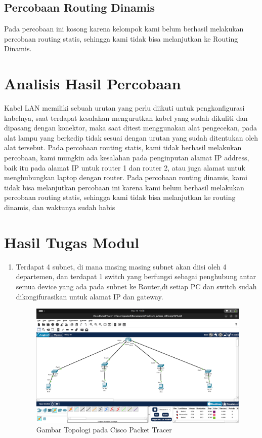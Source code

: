 \subsection{Percobaan Routing Dinamis}
Pada percobaan ini kosong karena kelompok kami belum berhasil melakukan percobaan routing statis,
sehingga kami tidak bisa melanjutkan ke Routing Dinamis.

\section{Analisis Hasil Percobaan}
Kabel LAN memiliki sebuah urutan yang perlu diikuti untuk pengkonfigurasi kabelnya, saat terdapat kesalahan
mengurutkan kabel yang sudah dikuliti dan dipasang dengan konektor, maka saat ditest menggunakan alat 
pengecekan, pada alat lampu yang berkedip tidak sesuai dengan urutan yang sudah ditentukan oleh alat tersebut.
Pada percobaan routing statis, kami tidak berhasil melakukan percobaan, kami mungkin ada kesalahan pada penginputan 
alamat IP address, baik itu pada alamat IP untuk router 1 dan router 2, atau juga alamat untuk menghubungkan
laptop dengan router. Pada percobaan routing dinamis, kami tidak bisa melanjutkan percobaan ini karena kami belum berhasil
melakukan percobaan routing statis, sehingga kami tidak bisa melanjutkan ke routing dinamis, dan waktunya
sudah habis
\section{Hasil Tugas Modul}
\begin{enumerate}
    \item Terdapat 4 subnet, di mana masing masing subnet akan diisi oleh 4 departemen, dan terdapat 1 switch
    yang berfungsi sebagai penghubung antar semua device yang ada pada subnet ke Router,di setiap PC dan switch
    sudah dikongifurasikan untuk alamat IP dan gateway. 
	\begin{figure}[H]
		\centering
		\includegraphics[width=0.5\linewidth]{cisco.png}
		\caption{Gambar Topologi pada Cisco Packet Tracer}
		\label{fig:gambar1}
	\end{figure}
\end{enumerate}


